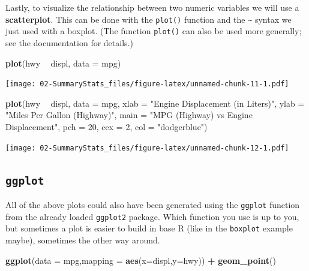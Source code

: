 \documentclass[]{book}
\newenvironment{Shaded}{\begin{snugshade}}{\end{snugshade}}
\newcommand{\KeywordTok}[1]{\textcolor[rgb]{0.13,0.29,0.53}{\textbf{#1}}}
\newcommand{\DataTypeTok}[1]{\textcolor[rgb]{0.13,0.29,0.53}{#1}}
\newcommand{\DecValTok}[1]{\textcolor[rgb]{0.00,0.00,0.81}{#1}}
\newcommand{\StringTok}[1]{\textcolor[rgb]{0.31,0.60,0.02}{#1}}
\newcommand{\OperatorTok}[1]{\textcolor[rgb]{0.81,0.36,0.00}{\textbf{#1}}}
\newcommand{\NormalTok}[1]{#1}
\begin{document}
Lastly, to visualize the relationship between two numeric variables we
will use a \textbf{scatterplot}. This can be done with the
\texttt{plot()} function and the \texttt{\textasciitilde{}} syntax we
just used with a boxplot. (The function \texttt{plot()} can also be used
more generally; see the documentation for details.)

\begin{Shaded}
\begin{Highlighting}[]
\KeywordTok{plot}\NormalTok{(hwy }\OperatorTok{~}\StringTok{ }\NormalTok{displ, }\DataTypeTok{data =}\NormalTok{ mpg)}
\end{Highlighting}
\end{Shaded}

\texttt{[image: 02-SummaryStats\_files/figure-latex/unnamed-chunk-11-1.pdf]}

\begin{Shaded}
\begin{Highlighting}[]
\KeywordTok{plot}\NormalTok{(hwy }\OperatorTok{~}\StringTok{ }\NormalTok{displ, }\DataTypeTok{data =}\NormalTok{ mpg,}
     \DataTypeTok{xlab =} \StringTok{"Engine Displacement (in Liters)"}\NormalTok{,}
     \DataTypeTok{ylab =} \StringTok{"Miles Per Gallon (Highway)"}\NormalTok{,}
     \DataTypeTok{main =} \StringTok{"MPG (Highway) vs Engine Displacement"}\NormalTok{,}
     \DataTypeTok{pch  =} \DecValTok{20}\NormalTok{,}
     \DataTypeTok{cex  =} \DecValTok{2}\NormalTok{,}
     \DataTypeTok{col  =} \StringTok{"dodgerblue"}\NormalTok{)}
\end{Highlighting}
\end{Shaded}

\texttt{[image: 02-SummaryStats\_files/figure-latex/unnamed-chunk-12-1.pdf]}

\subsection{\texorpdfstring{\texttt{ggplot}}{ggplot}}\label{ggplot}

All of the above plots could also have been generated using the
\texttt{ggplot} function from the already loaded \texttt{ggplot2}
package. Which function you use is up to you, but sometimes a plot is
easier to build in base R (like in the \texttt{boxplot} example maybe),
sometimes the other way around.

\begin{Shaded}
\begin{Highlighting}[]
\KeywordTok{ggplot}\NormalTok{(}\DataTypeTok{data =}\NormalTok{ mpg,}\DataTypeTok{mapping =} \KeywordTok{aes}\NormalTok{(}\DataTypeTok{x=}\NormalTok{displ,}\DataTypeTok{y=}\NormalTok{hwy)) }\OperatorTok{+}\StringTok{ }\KeywordTok{geom_point}\NormalTok{()}
\end{Highlighting}
\end{Shaded}
\end{document}
